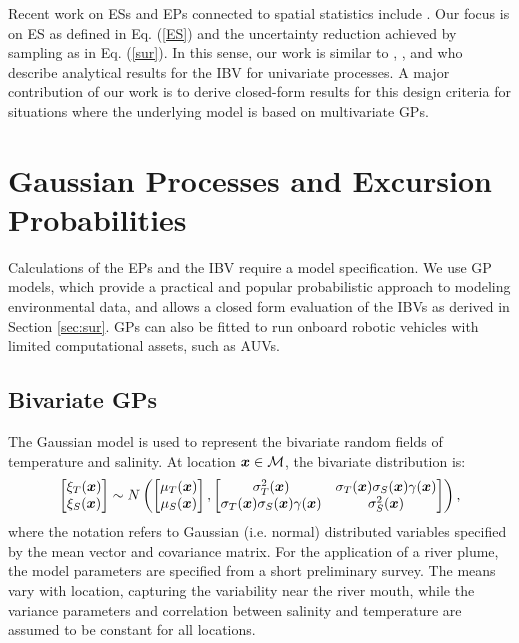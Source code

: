 \documentclass[aoas]{imsart}
\begin{document}
Recent work on ESs and EPs connected to spatial statistics include
\cite{picheny2010,french2013spatio,bolin2015excursion,french2016credible}.
Our focus is on ES as defined in Eq. (\ref{ES}) and the uncertainty
reduction achieved by sampling as in Eq. (\ref{sur}). In this sense,
our work is similar to \cite{bect2012}, \cite{chevalier2014fast}, and
\cite{azzimonti2016quantifying} who describe analytical results for
the IBV for univariate processes. A major contribution of our work is
to derive closed-form results for this design criteria for situations
where the underlying model is based on multivariate GPs.

\section{Gaussian Processes and Excursion Probabilities}
\label{sec:GP_EP}

Calculations of the EPs and the IBV require a model specification. We
use GP models, which provide a practical and popular probabilistic
approach to modeling environmental data, and allows a closed form
evaluation of the IBVs as derived in Section \ref{sec:sur}. GPs can
also be fitted to run onboard robotic vehicles with limited
computational assets, such as AUVs.

\subsection{Bivariate GPs}

The Gaussian model is used to represent the bivariate random fields of
temperature and salinity. At location ${\boldsymbol x} \in \mathcal{M}$, the
bivariate distribution is:
\begin{equation}\label{gp_bar}
  \begin{bmatrix}\xi_T(\bx) \\
    \xi_S(\bx) \end{bmatrix}
 \sim N \left( 
\begin{bmatrix} \mu_{T}(\bx)\\
\mu_{S}(\bx)
\end{bmatrix},\begin{bmatrix}
\sigma_{T}^2(\bx) & \sigma_{T}(\bx) \sigma_S(\bx) \gamma(\bx)  \\
\sigma_{T}(\bx) \sigma_S(\bx) \gamma(\bx)  & \sigma_{S}^2(\bx) 
\end{bmatrix}
\right),
\end{equation}
where the notation refers to Gaussian (i.e. normal) distributed
variables specified by the mean vector and covariance matrix. For the
application of a river plume, the model parameters are specified from
a short preliminary survey. The means vary with location, capturing
the variability near the river mouth, while the variance parameters
and correlation between salinity and temperature are assumed to be
constant for all locations. %
\end{document}
